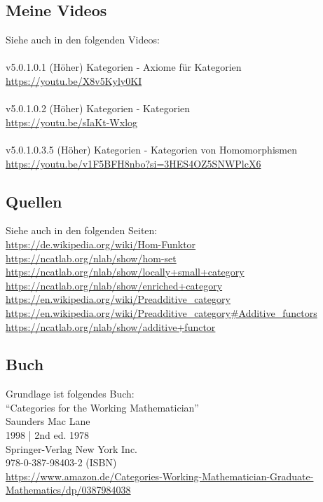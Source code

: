 \documentclass[a4paper]{amsart}
\theoremstyle{definition}
\begin{document}
\subsection*{Meine Videos}
Siehe auch in den folgenden Videos:\\
\\
v5.0.1.0.1 (Höher) Kategorien - Axiome für Kategorien\\
\url{https://youtu.be/X8v5Kyly0KI}\\
\\
v5.0.1.0.2 (Höher) Kategorien - Kategorien\\
\url{https://youtu.be/sIaKt-Wxlog}\\
\\
v5.0.1.0.3.5 (Höher) Kategorien - Kategorien von Homomorphismen\\
\url{https://youtu.be/v1F5BFH8nbo?si=3HES4OZ5SNWPlcX6}

\subsection*{Quellen}
Siehe auch in den folgenden Seiten:\\
\url{https://de.wikipedia.org/wiki/Hom-Funktor}\\
\url{https://ncatlab.org/nlab/show/hom-set}\\
\url{https://ncatlab.org/nlab/show/locally+small+category}\\
\url{https://ncatlab.org/nlab/show/enriched+category}\\
\url{https://en.wikipedia.org/wiki/Preadditive_category}\\
\url{https://en.wikipedia.org/wiki/Preadditive_category#Additive_functors}\\
\url{https://ncatlab.org/nlab/show/additive+functor}

\subsection*{Buch}
Grundlage ist folgendes Buch:\\
"`Categories for the Working Mathematician"'\\
Saunders Mac Lane\\
1998 | 2nd ed. 1978\\
Springer-Verlag New York Inc.\\
978-0-387-98403-2 (ISBN)\\
{\tiny
   \url{https://www.amazon.de/Categories-Working-Mathematician-Graduate-Mathematics/dp/0387984038}}\\
\end{document}

